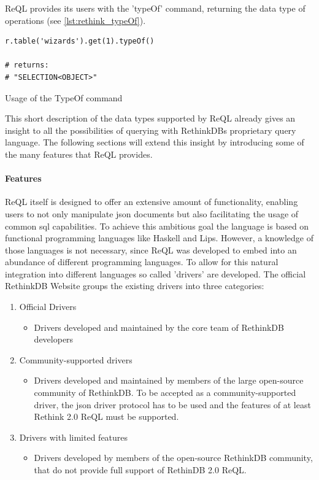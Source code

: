 ReQL provides its users with the 'typeOf' command, returning the data type of operations (see \autoref{lst:rethink_typeOf}).

\begin{listing}[ht]
\begin{verbatim}
r.table('wizards').get(1).typeOf()

# returns:
# "SELECTION<OBJECT>"
\end{verbatim}
\caption{Usage of the TypeOf command}
\label{lst:rethink_typeOf}
\end{listing}

This short description of the data types supported by ReQL already gives an insight to all the possibilities of querying with RethinkDBs proprietary query language. The following sections will extend this insight by introducing some of the many features that ReQL provides.

\paragraph{Features}
\label{sec:rethink_reql_features}

ReQL itself is designed to offer an extensive amount of functionality, enabling users to not only manipulate json documents but also facilitating the usage of common \gls{sql} capabilities. To achieve this ambitious goal the language is based on functional programming languages like Haskell and Lips. However, a knowledge of those languages is not necessary, since ReQL was developed to embed into an abundance of different programming languages. To allow for this natural integration into different languages so called 'drivers' are developed. The official RethinkDB Website groups the existing drivers into three categories:

\begin{enumerate}
    \item Official Drivers
    \begin{itemize}
        \item Drivers developed and maintained by the core team of RethinkDB developers
    \end{itemize}
    \item Community-supported drivers
    \begin{itemize}
        \item Drivers developed and maintained by members of the large open-source community of RethinkDB. To be accepted as a community-supported driver, the json driver protocol has to be used and the features of at least Rethink 2.0 ReQL must be supported.
    \end{itemize}
    \item Drivers with limited features
    \begin{itemize}
        \item Drivers developed by members of the open-source RethinkDB community, that do not provide full support of RethinDB 2.0 ReQL.
    \end{itemize}
\end{enumerate}

